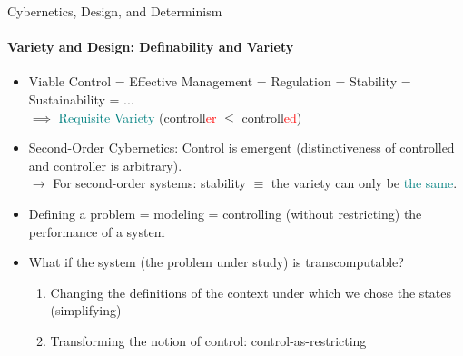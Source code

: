 \documentclass[
	11pt,
	aspectratio=169,
]{beamer}
\begin{document}
            \begin{frame}{Cybernetics, Design, and Determinism}
            \framesubtitle{Variety and Design: Definability and Variety}
    		    \begin{itemize}
    		        \item<1-> Viable Control = Effective Management = Regulation = Stability = Sustainability = ... \\
    		        $\implies$ \textcolor{teal}{Requisite Variety} (controll\textcolor{red}{er} $\leqslant$ controll\textcolor{red}{ed})
    		        \item<2-> Second-Order Cybernetics: Control is emergent (distinctiveness of controlled and controller is arbitrary).\\
        		        $\longrightarrow$ For second-order systems: stability $\equiv$ the variety can only be \textcolor{teal}{the same}.
                    \item<3-> Defining a problem = modeling = controlling (without restricting) the performance of a system\\
                    \item<4-> What if the system (the problem under study) is transcomputable?
                        \begin{enumerate}
                            \item<5-> Changing the definitions of the context under which we chose the states (simplifying)
                            \item<6-> Transforming the notion of control: control-as-restricting
                        \end{enumerate}
    		    \end{itemize}
            \end{frame}
\end{document}

